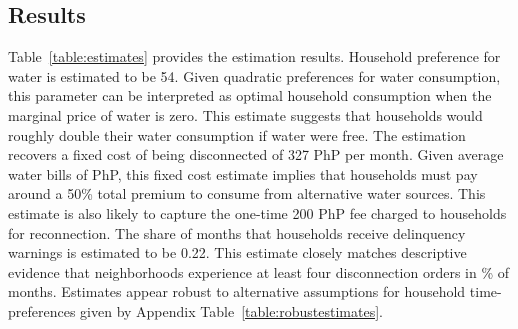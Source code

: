 \documentclass[12pt,table]{article}
\begin{document}
\subsection{Results}\label{section:results}    %

Table~\ref{table:estimates} provides the estimation results.  Household preference for water is estimated to be 54.  Given quadratic preferences for water consumption, this parameter can be interpreted as optimal household consumption when the marginal price of water is zero.  This estimate suggests that households would roughly double their water consumption if water were free.  The estimation recovers a fixed cost of being disconnected of 327 PhP per month.  Given average water bills of PhP, this fixed cost estimate implies that households must pay around a 50\% total premium to consume from alternative water sources.  This estimate is also likely to capture the one-time 200 PhP fee charged to households for reconnection.  The share of months that households receive delinquency warnings is estimated to be 0.22.  This estimate closely matches descriptive evidence that neighborhoods experience at least four disconnection orders in \unskip\% of months.  Estimates appear robust to alternative assumptions for household time-preferences given by Appendix Table~\ref{table:robustestimates}.


\end{document}
